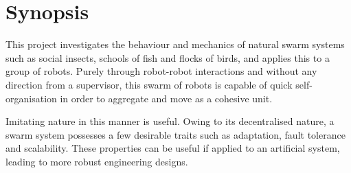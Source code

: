 \chapter*{Synopsis}


This project investigates the behaviour and mechanics of natural swarm systems such as social insects, schools of fish and flocks of birds, and applies this to a group of robots. Purely through robot-robot interactions and without any direction from a supervisor, this swarm of robots is capable of quick self-organisation in order to aggregate and move as a cohesive unit. 

Imitating nature in this manner is useful. Owing to its decentralised nature, a swarm system possesses a few desirable traits such as adaptation, fault tolerance and scalability. These properties can be useful if applied to an artificial system, leading to more robust engineering designs.